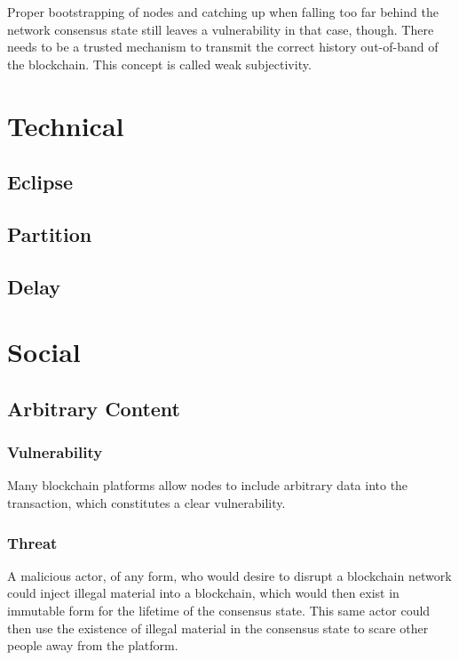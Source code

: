 \documentclass[11pt,a4paper,draft]{article}
\begin{document}
Proper bootstrapping of nodes and catching up when falling too far behind the network consensus state still leaves a vulnerability in that case, though. There needs to be a trusted mechanism to transmit the correct history out-of-band of the blockchain. This concept is called weak subjectivity.\\

\section{Technical}

\subsection{Eclipse}

\subsection{Partition}

\subsection{Delay}

\section{Social}

\subsection{Arbitrary Content}

\subsubsection{Vulnerability}

Many blockchain platforms allow nodes to include arbitrary data into the transaction, which constitutes a clear vulnerability.\\

\subsubsection{Threat}

A malicious actor, of any form, who would desire to disrupt a blockchain network could inject illegal material into a blockchain, which would then exist in immutable form for the lifetime of the consensus state. This same actor could then use the existence of illegal material in the consensus state to scare other people away from the platform.\\
\end{document}
